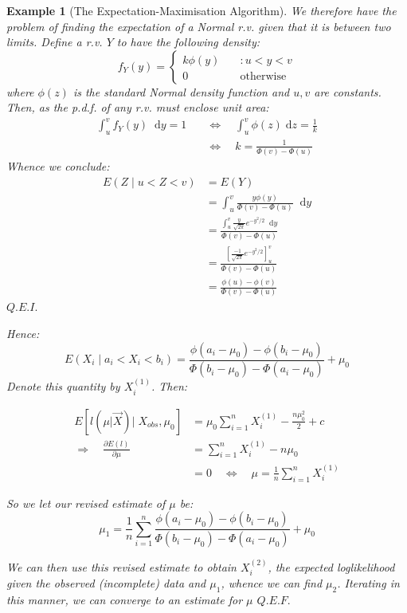 \documentclass[12pt,a4paper]{article}
\newtheorem{ex}[thm]{Example}
\newcommand{\diff}{\;\mathrm{d}}
\begin{document}
\begin{ex}[The Expectation-Maximisation Algorithm]
We therefore have the problem of finding the expectation of a Normal r.v. given that it is between two limits. Define a r.v. $Y$ to have the following density:
$$f_Y(y) = \left\{ \begin{array}{cl} k\phi(y)\quad& : u<y<v\\ 0 \quad& \mbox{otherwise}\end{array}\right.$$
where $\phi(z)$ is the standard Normal density function and $u,v$ are constants. Then, as the p.d.f. of any r.v. must enclose unit area:
\begin{align*}
\int_u^v\!\! f_Y(y)\;\diff y = 1 \quad &\Leftrightarrow\quad \int_u^v \!\! \phi(z) \diff z = \frac{1}{k}\\
&\Leftrightarrow\quad k = \frac{1}{\Phi(v) - \Phi(u)}
\end{align*}
Whence we conclude:
\begin{align*}
E(Z \mid u<Z<v) &= E(Y)\\
&= \int_u^v \!\! \frac{y\phi(y)}{\Phi(v)-\Phi(u)}\;\diff y\\
&= \frac{\int_u^v \!\! \frac{y}{\sqrt{2\pi}} e^{-y^2/2}\;\diff y}{\Phi(v)-\Phi(u)}\\
&= \frac{\left[\frac{-1}{\sqrt{2\pi}}e^{-y^2/2}\right]_u^v}{\Phi(v)-\Phi(u)}\\
&= \frac{\phi(u)-\phi(v)}{\Phi(v)-\Phi(u)}
\end{align*}\hfill$Q.E.I.$

\noindent Hence:
$$E(X_i \mid a_i< X_i<b_i) = \frac{\phi(a_i-\mu_0)-\phi(b_i-\mu_0)}{\Phi(b_i-\mu_0)-\Phi(a_i-\mu_0)}+\mu_0$$
Denote this quantity by $X_i^{(1)}$. Then:

\begin{align*}
E\left[l\left(\mu | \vec{X}\right) \bigg| \; X_{obs},\mu_0\right] &= \mu_0 \sum_{i=1}^n X_i^{(1)} - \frac{n\mu_0^2}{2} + c\\
\Rightarrow\quad \frac{\partial E(l)}{\partial \mu} &= \sum_{i=1}^n X_i^{(1)} - n\mu_0\\
&= 0 \quad\Leftrightarrow\quad \mu = \frac{1}{n}\sum_{i=1}^n X_i^{(1)}
\end{align*}

So we let our revised estimate of $\mu$ be:
$$\mu_1 = \frac{1}{n} \sum_{i=1}^n \frac{\phi(a_i-\mu_0)-\phi(b_i-\mu_0)}{\Phi(b_i-\mu_0)-\Phi(a_i-\mu_0)}+\mu_0$$

We can then use this revised estimate to obtain $X_i^{(2)}$, the expected loglikelihood given the observed (incomplete) data and $\mu_1$, whence we can find $\mu_2$. Iterating in this manner, we can converge to an estimate for $\mu$ \hfill$Q.E.F.$

\end{ex}
\end{document}
